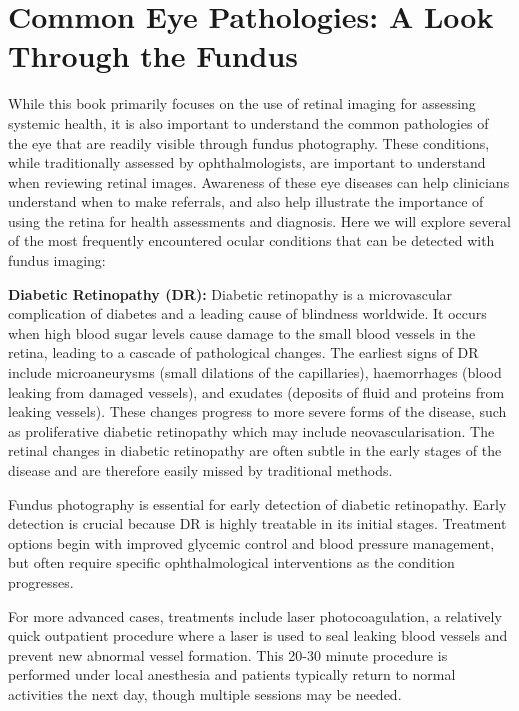 \documentclass[
  Letterpaper,
]{scrbook}
\begin{document}
\section{Common Eye Pathologies: A Look Through the
Fundus}\label{common-eye-pathologies-a-look-through-the-fundus}

While this book primarily focuses on the use of retinal imaging for
assessing systemic health, it is also important to understand the common
pathologies of the eye that are readily visible through fundus
photography. These conditions, while traditionally assessed by
ophthalmologists, are important to understand when reviewing retinal
images. Awareness of these eye diseases can help clinicians understand
when to make referrals, and also help illustrate the importance of using
the retina for health assessments and diagnosis. Here we will explore
several of the most frequently encountered ocular conditions that can be
detected with fundus imaging:

\textbf{Diabetic Retinopathy (DR):} Diabetic retinopathy is a
microvascular complication of diabetes and a leading cause of blindness
worldwide. It occurs when high blood sugar levels cause damage to the
small blood vessels in the retina, leading to a cascade of pathological
changes. The earliest signs of DR include microaneurysms (small
dilations of the capillaries), haemorrhages (blood leaking from damaged
vessels), and exudates (deposits of fluid and proteins from leaking
vessels). These changes progress to more severe forms of the disease,
such as proliferative diabetic retinopathy which may include
neovascularisation. The retinal changes in diabetic retinopathy are
often subtle in the early stages of the disease and are therefore easily
missed by traditional methods.

Fundus photography is essential for early detection of diabetic
retinopathy. Early detection is crucial because DR is highly treatable
in its initial stages. Treatment options begin with improved glycemic
control and blood pressure management, but often require specific
ophthalmological interventions as the condition progresses.

For more advanced cases, treatments include laser photocoagulation, a
relatively quick outpatient procedure where a laser is used to seal
leaking blood vessels and prevent new abnormal vessel formation. This
20-30 minute procedure is performed under local anesthesia and patients
typically return to normal activities the next day, though multiple
sessions may be needed.
\end{document}
